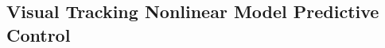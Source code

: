 \documentclass[letterpaper, 10 pt, conference]{ieeeconf}  %
\begin{document}



\subsection{Visual Tracking Nonlinear Model Predictive Control }




\end{document}
